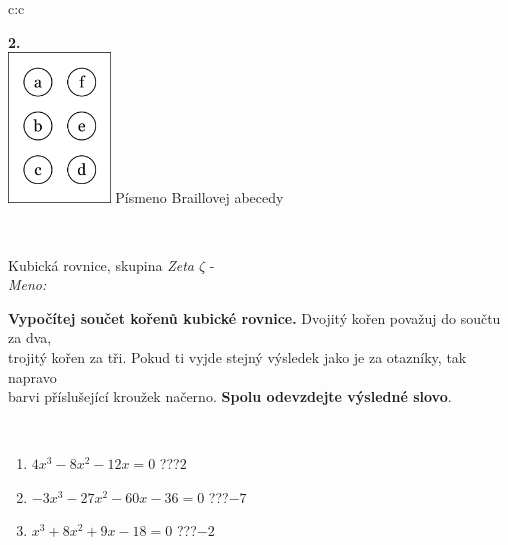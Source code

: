 \documentclass[10pt]{report}
\begin{document}
\begin{tabular}{c:c}
\begin{minipage}[c][104.5mm][t]{0.5\linewidth}
\begin{center}
\begin{minipage}{0.79\linewidth}
\begin{center}
\begin{varwidth}{\linewidth}
\end{varwidth}
\end{center}
\end{minipage}
\begin{minipage}{0.20\linewidth}
\begin{center}
{\Huge\bfseries 2.} \\[2mm]
\includegraphics[height=40mm]{../images/braille.png}
{\small Písmeno Braillovej abecedy}
\end{center}
\end{minipage}
\end{center}
\end{minipage}
\\ \hdashline
\begin{minipage}[c][104.5mm][t]{0.5\linewidth}
\begin{center}
\vspace{7mm}
{\huge Kubická rovnice, skupina \textit{Zeta $\zeta$} -}\\[5mm]
\textit{Meno:}\phantom{xxxxxxxxxxxxxxxxxxxxxxxxxxxxxxxxxxxxxxxxxxxxxxxxxxxxxxxxxxxxxxxxx}\\[5mm]
\begin{minipage}{0.95\linewidth}
\textbf{Vypočítej součet kořenů kubické rovnice.} Dvojitý kořen považuj do součtu za dva,\\trojitý kořen za tři. Pokud ti vyjde stejný výsledek jako je za otazníky, tak napravo\\barvi příslušející kroužek načerno. \textbf{Spolu odevzdejte výsledné slovo}.
\end{minipage}
\\[1mm]
\begin{minipage}{0.79\linewidth}
\begin{center}
\begin{varwidth}{\linewidth}
\begin{enumerate}
\Large
\item $4x^3-8x^2-12x=0$\quad \dotfill\; ???\;\dotfill \quad $2$
\item $-3x^3-27x^2-60x-36=0$\quad \dotfill\; ???\;\dotfill \quad $-7$
\item $x^3+8x^2+9x-18=0$\quad \dotfill\; ???\;\dotfill \quad $-2$

\end{enumerate}
\end{varwidth}
\end{center}
\end{minipage}
\end{center}
\end{minipage}
\end{tabular}
\end{document}
